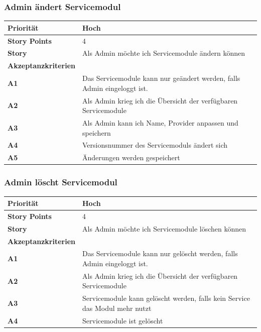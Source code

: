 \documentclass[11pt]{scrartcl}
\begin{document}
   \subsubsection{Admin ändert Servicemodul}
\begin{tabularx}{\linewidth}{l X}
  \textbf{Priorität} & Hoch\\
  \hline
  \textbf{Story Points} & 4\\
  \hline
  \textbf{Story}& Als Admin möchte ich Servicemodule ändern können\\
  \hline
    \textbf{Akzeptanzkriterien} & \\
    \hline
      \textbf{A1} & Das Servicemodule kann nur geändert werden, falls Admin eingeloggt ist.\\
  \hline
  \textbf{A2} & Als Admin krieg ich die Übersicht der verfügbaren Servicemodule\\
  \hline
  \textbf{A3} & Als Admin kann ich Name, Provider anpassen und speichern\\
  \hline
    \textbf{A4} & Versionsnummer des Servicemoduls ändert sich\\
  \hline
    \textbf{A5} & Änderungen werden gespeichert\\
  \hline
 \end{tabularx}
 
 
 \subsubsection{Admin löscht Servicemodul}
 
 \begin{tabularx}{\linewidth}{l X}
  \textbf{Priorität} & Hoch\\
  \hline
  \textbf{Story Points} & 4\\
  \hline
  \textbf{Story}& Als Admin möchte ich Servicemodule löschen können\\
  \hline
    \textbf{Akzeptanzkriterien} & \\
    \hline
      \textbf{A1} & Das Servicemodule kann nur gelöscht werden, falls Admin eingeloggt ist.\\
  \hline
  \textbf{A2} & Als Admin krieg ich die Übersicht der verfügbaren Servicemodule\\
  \hline
  \textbf{A3} & Servicemodule kann gelöscht werden, falls kein Service das Modul mehr nutzt\\
  \hline
    \textbf{A4} & Servicemodule ist gelöscht\\
  \hline
 \end{tabularx}
 
\end{document}
